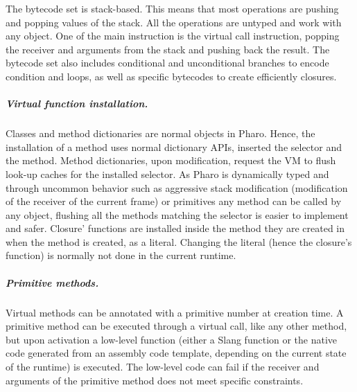\documentclass[a4paper,12pt,twoside]{../includes/ThesisStyle}
\begin{document}
The bytecode set is stack-based. This means that most operations are pushing and popping values of the stack. All the operations are untyped and work with any object. One of the main instruction is the virtual call instruction, popping the receiver and arguments from the stack and pushing back the result. The bytecode set also includes conditional and unconditional branches to encode condition and loops, as well as specific bytecodes to create efficiently closures.









\subparagraph{Virtual function installation.}

Classes and method dictionaries are normal objects in Pharo. Hence, the installation of a method uses normal dictionary APIs, inserted the selector and the method. Method dictionaries, upon modification, request the VM to flush look-up caches for the installed selector. As Pharo is dynamically typed and through uncommon behavior such as aggressive stack modification (modification of the receiver of the current frame) or primitives any method can be called by any object, flushing all the methods matching the selector is easier to implement and safer. Closure' functions are installed inside the method they are created in when the method is created, as a literal. Changing the literal (hence the closure's function) is normally not done in the current runtime.

\subparagraph{Primitive methods.}

Virtual methods can be annotated with a primitive number at creation time. A primitive method can be executed through a virtual call, like any other method, but upon activation a low-level function (either a Slang function or the native code generated from an assembly code template, depending on the current state of the runtime) is executed. The low-level code can fail if the receiver and arguments of the primitive method does not meet specific constraints. 
\end{document}
